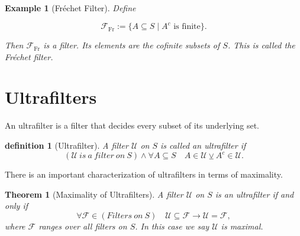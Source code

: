 \documentclass[10pt,a4paper]{book}
\newtheorem{definition}{definition}[section]
\newtheorem{theorem}{Theorem}[section]
\newtheorem{example}{Example}[section]
\begin{document}
\begin{example}[Fr\'echet Filter]

    Define

    $$
        \mathcal{F}_{\mathrm{Fr}} := \{A \subseteq S \mid  A^c \text{ is finite}\}.
    $$

    Then $\mathcal{F}_{\mathrm{Fr}}$ is a filter. Its elements are the cofinite subsets of
    $S$. This is called the \emph{Fr\'echet filter}.

\end{example}

\section{Ultrafilters}

An ultrafilter is a filter that decides every subset of its underlying set.

\begin{definition}[Ultrafilter]

    A filter $\mathcal{U}$ on $S$ is called an \emph{ultrafilter} if
    \[
        (\mathcal{U} \ is \ a \ filter \ on \ S) \land  \forall A \subseteq S \quad
        A \in \mathcal{U} \veebar A^c \in \mathcal{U}.
    \]

\end{definition}

There is an important characterization of ultrafilters in terms of maximality.

\begin{theorem}[Maximality of Ultrafilters]

    A filter $\mathcal{U}$ on $S$ is an ultrafilter if and only if
    \[
        \forall \mathcal{F} \in (Filters \ on \ S) \quad
        \mathcal{U} \subseteq \mathcal{F}
        \to \mathcal{U}=\mathcal{F},
    \]
    where $\mathcal{F}$ ranges over all filters on $S$.
    In this case we say $\mathcal{U}$  is  maximal.

\end{theorem}
\end{document}
